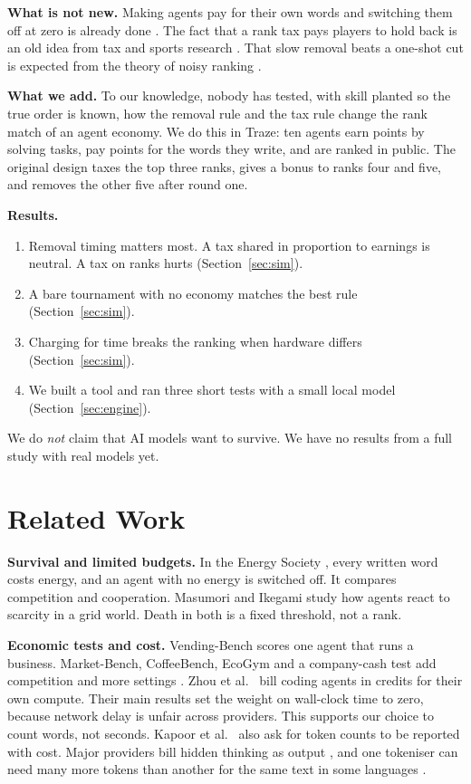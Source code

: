 \documentclass[conference]{IEEEtran}
\theoremstyle{plain}
\begin{document}
\textbf{What is not new.} Making agents pay for their own words and switching them off at zero is already done \cite{hansen2026energy,zhou2026credit}. The fact that a rank tax pays players to hold back is an old idea from tax and sports research \cite{kleven2013notches,dagaev2018winning}. That slow removal beats a one-shot cut is expected from the theory of noisy ranking \cite{jamieson2015halving,braverman2007noisy}.

\textbf{What we add.} To our knowledge, nobody has tested, with skill planted so the true order is known, how the removal rule and the tax rule change the rank match of an agent economy. We do this in Traze: ten agents earn points by solving tasks, pay points for the words they write, and are ranked in public. The original design taxes the top three ranks, gives a bonus to ranks four and five, and removes the other five after round one.

\textbf{Results.}
\begin{enumerate}
\item Removal timing matters most. A tax shared in proportion to earnings is neutral. A tax on ranks hurts (Section~\ref{sec:sim}).
\item A bare tournament with no economy matches the best rule (Section~\ref{sec:sim}).
\item Charging for time breaks the ranking when hardware differs (Section~\ref{sec:sim}).
\item We built a tool and ran three short tests with a small local model (Section~\ref{sec:engine}).
\end{enumerate}
We do \emph{not} claim that AI models want to survive. We have no results from a full study with real models yet.

\section{Related Work}
\textbf{Survival and limited budgets.} In the Energy Society \cite{hansen2026energy}, every written word costs energy, and an agent with no energy is switched off. It compares competition and cooperation. Masumori and Ikegami \cite{masumori2025survival} study how agents react to scarcity in a grid world. Death in both is a fixed threshold, not a rank.

\textbf{Economic tests and cost.} Vending-Bench \cite{backlund2025vendingbench} scores one agent that runs a business. Market-Bench, CoffeeBench, EcoGym and a company-cash test add competition and more settings \cite{zheng2026marketbench,sugiura2026coffeebench,hu2026ecogym,han2026cfo}. Zhou et al.\ \cite{zhou2026credit} bill coding agents in credits for their own compute. Their main results set the weight on wall-clock time to zero, because network delay is unfair across providers. This supports our choice to count words, not seconds. Kapoor et al.\ \cite{kapoor2024agents} also ask for token counts to be reported with cost. Major providers bill hidden thinking as output \cite{openai2026reasoning,anthropic2026thinking}, and one tokeniser can need many more tokens than another for the same text in some languages \cite{petrov2023tokenizers}.
\end{document}
